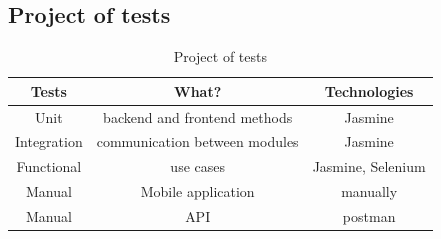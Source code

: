 \documentclass{sprawozdanie-agh}
\begin{document}
		\subsection{Project of tests}
		
		\begin{table}[h]
			\centering
			\begin{tabular}{|c|c|c|}
				\hline
				\textbf{Tests} & \textbf{What?} & \textbf{Technologies} \\
				\hline
				Unit & backend and frontend methods & Jasmine \\ \hline
				Integration & communication between modules & Jasmine \\ \hline
				Functional & use cases & Jasmine, Selenium \\ \hline
				Manual & Mobile application & manually \\ \hline
				Manual & API & postman \\ \hline
			\end{tabular}
			\caption{Project of tests}
		\end{table}
\end{document}
